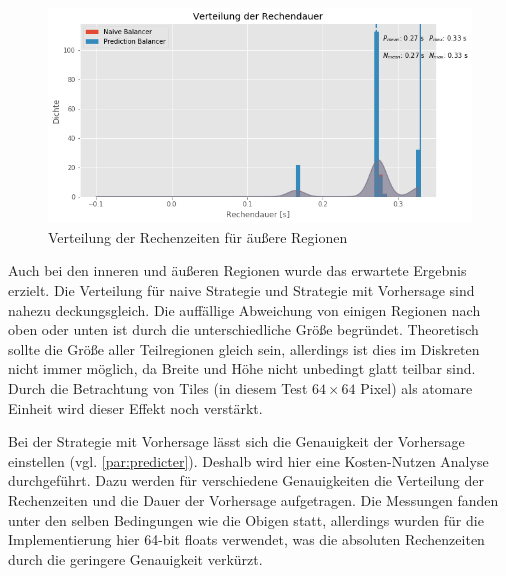 \begin{figure}
	\centering
	\includegraphics[width=0.9\linewidth]{img/Evaluation/balancers/balancers_outside.png}
	\caption{Verteilung der Rechenzeiten für äußere Regionen}
	\label{fig:balancers_outside}
\end{figure}

Auch bei den inneren und äußeren Regionen wurde das erwartete Ergebnis erzielt.
Die Verteilung für naive Strategie und Strategie mit Vorhersage sind nahezu deckungsgleich.
Die auffällige Abweichung von einigen Regionen nach oben oder unten ist durch die unterschiedliche Größe begründet.
Theoretisch sollte die Größe aller Teilregionen gleich sein, allerdings ist dies im Diskreten nicht immer möglich, da Breite und Höhe nicht unbedingt glatt teilbar sind.
Durch die Betrachtung von Tiles (in diesem Test $64\times64$ Pixel) als atomare Einheit wird dieser Effekt noch verstärkt.

Bei der Strategie mit Vorhersage lässt sich die Genauigkeit der Vorhersage einstellen (vgl. \autoref{par:predicter}).
Deshalb wird hier eine Kosten-Nutzen Analyse durchgeführt.
Dazu werden für verschiedene Genauigkeiten die Verteilung der Rechenzeiten und die Dauer der Vorhersage aufgetragen.
Die Messungen fanden unter den selben Bedingungen wie die Obigen statt, allerdings wurden für die Implementierung hier 64-bit floats verwendet, was die absoluten Rechenzeiten durch die geringere Genauigkeit verkürzt.


